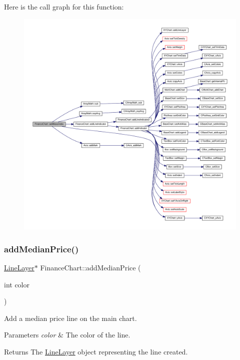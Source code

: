Here is the call graph for this function\+:
\nopagebreak
\begin{figure}[H]
\begin{center}
\leavevmode
\includegraphics[width=350pt]{class_finance_chart_a452f5d65f747033467a62eb280babfdc_cgraph}
\end{center}
\end{figure}
\mbox{\label{class_finance_chart_a3957929ae30662dcfa410c1a2263bb92}} 
\subsubsection{\texorpdfstring{add\+Median\+Price()}{addMedianPrice()}}
{\footnotesize\ttfamily \hyperlink{class_line_layer}{Line\+Layer}$\ast$ Finance\+Chart\+::add\+Median\+Price (\begin{DoxyParamCaption}\item[{int}]{color }\end{DoxyParamCaption})\hspace{0.3cm}{\ttfamily [inline]}}



Add a median price line on the main chart. 


\begin{DoxyParams}{Parameters}
{\em color} & The color of the line.\\
\hline
\end{DoxyParams}
\begin{DoxyReturn}{Returns}
The \hyperlink{class_line_layer}{Line\+Layer} object representing the line created.
\end{DoxyReturn}


